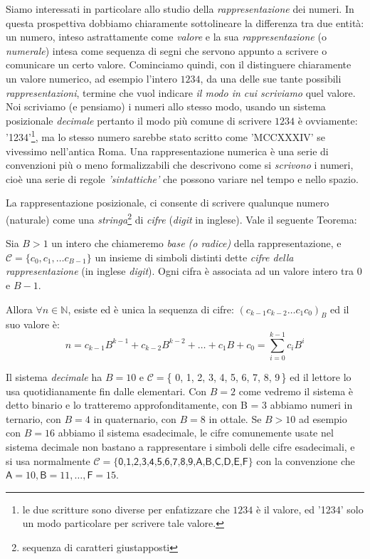 Siamo interessati in particolare allo studio della \emph{rappresentazione} dei
numeri. In questa prospettiva dobbiamo chiaramente sottolineare la differenza
tra due entità: un numero, inteso astrattamente come \emph{valore} e la sua
\emph{rappresentazione} (o \emph{numerale}) intesa come sequenza di segni che
servono appunto a scrivere o comunicare un certo valore. Cominciamo quindi,
 con il distinguere chiaramente un valore
numerico, ad esempio l'intero $1234$, da una delle sue tante possibili
\emph{rappresentazioni}, termine che vuol indicare \emph{il modo in cui
scriviamo} quel valore. Noi scriviamo (e pensiamo) i numeri allo stesso modo,
usando un sistema posizionale \emph{decimale} pertanto il modo più comune di
scrivere $1234$ è ovviamente: \textsf{'1234'}\footnote{le due scritture sono
diverse per enfatizzare che $1234$ è il valore, ed \textsf{'1234'} solo un modo
particolare per scrivere tale valore.}, ma lo stesso numero sarebbe stato
scritto come \textsf{'MCCXXXIV'} se vivessimo nell'antica Roma. Una
rappresentazione numerica è una serie di convenzioni più o meno formalizzabili
che descrivono come si \emph{scrivono} i numeri, cioè una serie di regole
\emph{'sintattiche'} che possono variare nel tempo e nello spazio.

La rappresentazione posizionale, ci consente di scrivere qualunque numero
(naturale) come una \emph{stringa}\footnote{sequenza di caratteri giustapposti}
di \emph{cifre} (\emph{digit} in inglese). Vale il seguente Teorema:




\begin{thm} Sia $B>1$ un
intero che chiameremo \emph{base (o radice)} della rap\-presentazione, e
$\mathcal{C} = \{ c_0, c_1, \ldots c_{B-1} \}$ un insieme di simboli distinti
dette \emph{cifre della rappresentazione} (in inglese \emph{digit}). Ogni cifra
è associata ad un valore intero tra $0$ e $B-1$.\bigskip

Allora $\forall n \in \mathbb{N}$, esiste ed è unica la sequenza di cifre:
$(c_{k-1}c_{k-2} \ldots c_1c_0)_B$ ed il suo valore è:
\begin{equation}\label{eq:pos} 
n = c_{k-1}B^{k-1}+c_{k-2}B^{k-2}+\ldots+c_1B+c_0 = \sum_{i=0}^{k-1} c_iB^i
\end{equation} \end{thm} %

Il sistema \emph{decimale} ha $B = 10$ e $\mathcal{C} = $\{\textsf{ 0, 1, 2, 3,
4, 5, 6, 7, 8, 9}\,\} ed il lettore lo usa quotidianamente fin dalle
elementari.  Con $B =
2$ come vedremo il sistema è detto binario e lo tratteremo approfonditamente,
con B = 3 abbiamo numeri in ternario, con $B = 4$ in quaternario, con $B = 8$
in ottale. Se $B > 10$ ad esempio con $B = 16$ abbiamo il sistema esadecimale,
le cifre comunemente usate nel sistema decimale non bastano a rappresentare i
simboli delle cifre esadecimali, e si usa normalmente $\mathcal{C} = \{
\textsf{0,1,2,3,4,5,6,7,8,9,A,B,C,D,E,F} \}$ con la convenzione che $\textsf{A}
= 10, \textsf{B} = 11, \ldots, \textsf{F} = 15$.

